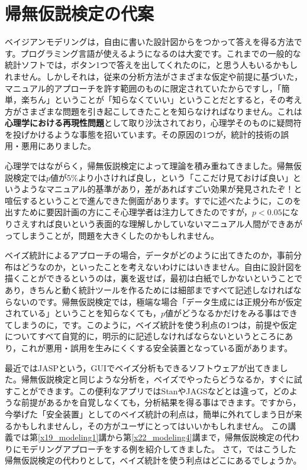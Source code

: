 \documentclass{ltjsbook}
\begin{document}
\section{帰無仮説検定の代案}
ベイジアンモデリングは，自由に書いた設計図からをつかって答えを得る方法です。プログラミング言語が使えるようになるのは大変です。これまでの一般的な統計ソフトでは，ボタン1つで答えを出してくれたのに，と思う人もいるかもしれません。しかしそれは，従来の分析方法がさまざまな仮定や前提に基づいた，マニュアル的アプローチを許す範囲のものに限定されていたからですし，「簡単，楽ちん」ということが「知らなくていい」ということだとすると，その考え方がさまざまな問題を引き起こしてきたことを知らなければなりません。これは\textbf{心理学における再現性問題}\textcite{Ikeda2016}として取り沙汰されており，心理学そのものに疑問符を投げかけるような事態を招いています。その原因の1つが，統計的技術の誤用・悪用にありました。

心理学ではながらく，帰無仮説検定によって理論を積み重ねてきました。帰無仮説検定では$p$値が5\%より小さければ良し，という「ここだけ見ておけば良い」というようなマニュアル的基準があり，差があればすごい効果が発見されたぞ！と喧伝するということで進んできた側面があります。すでに述べたように，このを出すために要因計画の方にこそ心理学者は注力してきたのですが，$p<0.05$になりさえすれば良いという表面的な理解しかしていないマニュアル人間ができあがってしまうことが，問題を大きくしたのかもしれません。

ベイズ統計によるアプローチの場合，データがどのように出てきたのか，事前分布はどうなのか，といったことを考えないわけにはいきません。自由に設計図を描くことができるというのは，裏を返せば，最初は白紙でしかないということであり，きちんと動く統計ツールを作るためには細部まですべて記述しなければならないのです。帰無仮説検定では，極端な場合「データ生成には正規分布が仮定されている」ということを知らなくても，$p$値がどうなるかだけをみる事はできてしまうのに，です。このように，ベイズ統計を使う利点の1つは，前提や仮定についてすべて自覚的に，明示的に記述しなければならないというところにあり，これが悪用・誤用を生みにくくする安全装置となっている面があります。

最近ではJASP\textcite{JASP2021}という，GUIでベイズ分析もできるソフトウェアが出てきました。帰無仮説検定と同じような分析を，ベイズでやったらどうなるか，すぐに試すことができます。この便利なアプリではStanやJAGSなどとは違って，どのような前提があるかを自覚しなくても，分析結果を得る事はできます。ですから，今挙げた「安全装置」としてのベイズ統計の利点は，簡単に外れてしまう日が来るかもしれませんし，その方がユーザにとってはいいかもしれません。
この講義では第\ref{x19_modeling1}講から第\ref{x22_modeling4}講まで，帰無仮説検定の代わりにモデリングアプローチをする例を紹介してきました。
さて，ではこうした帰無仮説検定の代わりとして，ベイズ統計を使う利点はどこにあるでしょうか。
\end{document}
